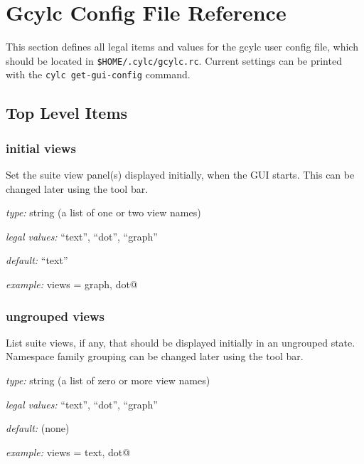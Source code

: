 
\section{Gcylc Config File Reference}
\label{GcylcRCReference}

\lstset{language=bash}

This section defines all legal items and values for the gcylc user
config file, which should be located in
\lstinline=$HOME/.cylc/gcylc.rc=.
Current settings can be printed with the \lstinline=cylc get-gui-config=
command.

\subsection{Top Level Items}

\subsubsection{initial views}

Set the suite view panel(s) displayed initially, when the GUI starts.
This can be changed later using the tool bar.

\begin{myitemize}
\item {\em type:} string (a list of one or two view names)
\item {\em legal values:} ``text'', ``dot'',  ``graph''
\item {\em default:} ``text''
\item {\em example:} \lstinline@initial views = graph, dot@
\end{myitemize}

\subsubsection{ungrouped views}

List suite views, if any, that should be displayed initially in an
ungrouped state. Namespace family grouping can be changed later
using the tool bar.

\begin{myitemize}
\item {\em type:} string (a list of zero or more view names)
\item {\em legal values:} ``text'', ``dot'',  ``graph''
\item {\em default:} (none)
\item {\em example:} \lstinline@ungrouped views = text, dot@
\end{myitemize}

